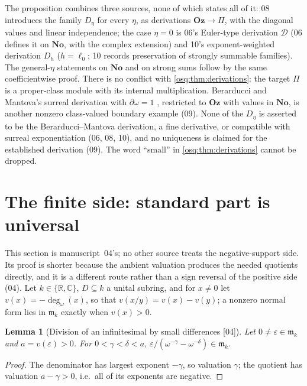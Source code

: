 \documentclass[11pt,letterpaper]{article}
\numberwithin{equation}{section}
\newtheorem{lemma}[lemma]{Lemma}
\theoremstyle{definition}
\theoremstyle{remark}
\theoremstyle{plain}
\newcommand{\No}{\mathbf{No}}
\newcommand{\Oz}{\mathbf{Oz}}
\newcommand{\R}{\mathbb R}
\newcommand{\C}{\mathbb C}
\newcommand{\mm}{\mathfrak m}        %
\newcommand{\degw}{\deg_{\omega}}
\newcommand{\src}[1]{\textup{\textsf{[#1]}}}
\begin{document}
The proposition combines three sources, none of which states all of it: 08 introduces the
family $D_\eta$ for every $\eta$, as derivations $\Oz\to\Pi$, with the diagonal values and
linear independence; the case $\eta=0$ is 06's Euler-type derivation $\mathcal D$ (06 defines
it on $\No$, with the complex extension) and 10's exponent-weighted derivation $D_h$
($h=\ell_0$; 10 records preservation of strongly summable families). The general-$\eta$
statements on $\No$ and on strong sums follow by the same coefficientwise proof. There is no conflict with
\cref{osq:thm:derivations}: the target $\Pi$ is a proper-class module with its internal
multiplication. Berarducci and Mantova's surreal derivation with $\partial\omega=1$
\cite{BM}, restricted to $\Oz$ with values in $\No$, is another nonzero class-valued
boundary example (09). None of the $D_\eta$ is asserted to be the Berarducci--Mantova
derivation, a fine derivative, or compatible with surreal exponentiation (06, 08, 10), and
no uniqueness is claimed for the established derivation (09). The word ``small'' in
\cref{osq:thm:derivations} cannot be dropped.

\section{The finite side: standard part is universal}\label{osq:sec:finite}

This section is manuscript~04's; no other source treats the negative-support side. Its proof
is shorter because the ambient valuation produces the needed quotients directly, and it is a
different route rather than a sign reversal of the positive side (04). Let $k\in\{\R,\C\}$,
$D\subseteq k$ a unital subring, and for $x\ne0$ let $v(x)=-\degw(x)$, so that
$v(x/y)=v(x)-v(y)$; a nonzero normal form lies in $\mm_k$ exactly when $v(x)>0$.

\begin{lemma}[Division of an infinitesimal by small differences \src{04}]\label{osq:lem:finitediff}
Let $0\ne\varepsilon\in\mm_k$ and $a=v(\varepsilon)>0$. For $0<\gamma<\delta<a$,
$\varepsilon/(\omega^{-\gamma}-\omega^{-\delta})\in\mm_k$.
\end{lemma}
\begin{proof}
The denominator has largest exponent $-\gamma$, so valuation $\gamma$; the quotient has
valuation $a-\gamma>0$, i.e.\ all of its exponents are negative.
\end{proof}
\end{document}
